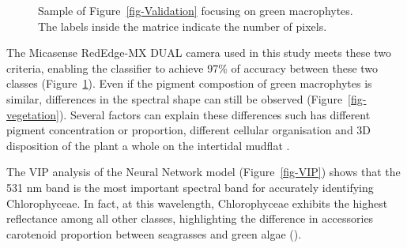 \documentclass[
  number]{elsarticle}
\begin{document}
\label{cell-fig-ValidationGreen}
\begin{figure}[H]


\caption{\label{fig-ValidationGreen}Sample of
Figure~\ref{fig-Validation} focusing on green macrophytes. The labels
inside the matrice indicate the number of pixels.}

\end{figure}%

The Micasense RedEdge-MX DUAL camera used in this study meets these two
criteria, enabling the classifier to achieve 97\% of accuracy between
these two classes (Figure~\ref{fig-ValidationGreen}). Even if the
pigment compostion of green macrophytes is similar, differences in the
spectral shape can still be observed (Figure~\ref{fig-vegetation}).
Several factors can explain these differences such has different pigment
concentration or proportion, different cellular organisation and 3D
disposition of the plant a whole on the intertidal mudflat
\citep[\citep{kirk1994light},
\citep{hedley2018influence}]{beach1997vivo}.

The VIP analysis of the Neural Network model (Figure~\ref{fig-VIP})
shows that the 531 nm band is the most important spectral band for
accurately identifying Chlorophyceae. In fact, at this wavelength,
Chlorophyceae exhibits the highest reflectance among all other classes,
highlighting the difference in accessories carotenoid proportion between
seagrasses and green algae (\citep{repolho2017seagrass}).
\end{document}
